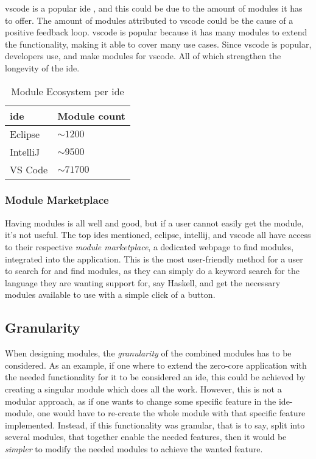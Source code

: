 
\gls{vscode} is a popular \gls{ide} \cite{topIde}, and this could be due to
the amount of modules it has to offer. The amount of modules attributed to
\gls{vscode} could be the cause of a positive feedback loop. \gls{vscode} is
popular because it has many modules to extend the functionality, making it able
to cover many use cases. Since \gls{vscode} is popular, developers use, and make
modules for \gls{vscode}. All of which strengthen the longevity of the
\gls{ide}.

\begin{table}[]
  \centering
  \caption{Module Ecosystem per \gls{ide}}
  \label{tbl:mod}
  \begin{tabular}{|l|l|}
    \hline
    \gls{ide} & Module count \\ \hline
    Eclipse & $\sim1200$ \\ \hline
    IntelliJ & $\sim9500$ \\ \hline
    VS Code & $\sim71700$ \\ \hline
  \end{tabular}
\end{table}

\subsubsection{Module Marketplace}

Having modules is all well and good, but if a user cannot easily get the
module, it's not useful. The top \gls{ide}s mentioned, \gls{eclipse},
\gls{intellij}, and \gls{vscode} all have access to their respective
\textit{module marketplace}, a dedicated webpage to find modules, integrated
into the application. This is the most user-friendly method for a user to search
for and find modules, as they can simply do a keyword search for the language
they are wanting support for, say Haskell, and get the necessary modules
available to use with a simple click of a button.

\subsection{Granularity}

When designing modules, the \textit{granularity} of the combined modules has to
be considered. As an example, if one where to extend the zero-core application
with the needed functionality for it to be considered an \gls{ide}, this could be
achieved by creating a singular module which does all the work. However, this
is not a modular approach, as if one wants to change some specific feature in
the \gls{ide}-module, one would have to re-create the whole module with that
specific feature implemented. Instead, if this functionality was granular,
that is to say, split into several modules, that together enable the needed
features, then it would be \textit{simpler} to modify the needed modules to
achieve the wanted feature.


